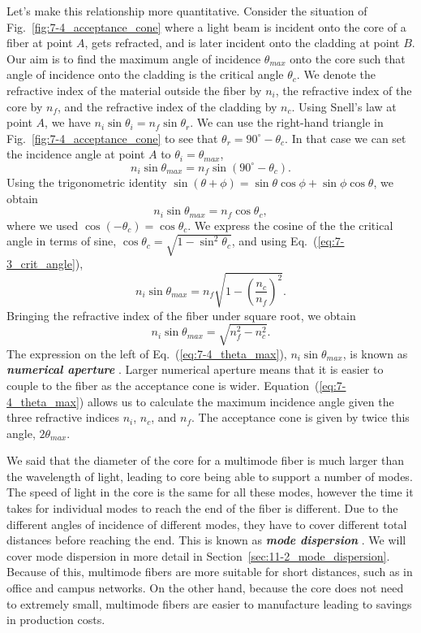 Let's make this relationship more quantitative.
Consider the situation of Fig.~\ref{fig:7-4_acceptance_cone} where a light beam is incident onto the core of a fiber at point $A$, gets refracted, and is later incident onto the cladding at point $B$.
Our aim is to find the maximum angle of incidence $\theta_{max}$ onto the core such that angle of incidence onto the cladding is the critical angle $\theta_c$.
We denote the refractive index of the material outside the fiber by $n_i$, the refractive index of the core by $n_f$, and the refractive index of the cladding by $n_c$.
Using Snell's law at point $A$, we have $n_i \sin \theta_i = n_f \sin \theta_r$.
We can use the right-hand triangle in Fig.~\ref{fig:7-4_acceptance_cone} to see that $\theta_r = 90^{\circ} - \theta_c$.
In that case we can set the incidence angle at point $A$ to $\theta_i = \theta_{max}$,
\begin{equation}
    n_i \sin \theta_{max} = n_f \sin (90^{\circ} - \theta_c).
\end{equation}
Using the trigonometric identity $\sin(\theta + \phi) = \sin\theta\cos\phi + \sin\phi\cos\theta$, we obtain
\begin{equation}
    n_i \sin \theta_{max} = n_f \cos\theta_c,
\end{equation}
where we used $\cos(-\theta_c) = \cos\theta_c$.
We express the cosine of the the critical angle in terms of sine, $\cos\theta_c = \sqrt{1 - \sin^2\theta_c}$, and using Eq.~(\ref{eq:7-3_crit_angle}),
\begin{equation}
    n_i \sin \theta_{max} = n_f \sqrt{1 - \left( \frac{n_c}{n_f} \right)^2}.
\end{equation}
Bringing the refractive index of the fiber under square root, we obtain
\begin{equation}
    n_i \sin \theta_{max} = \sqrt{n_f^2 -  n_c^2}.
    \label{eq:7-4_theta_max}
\end{equation}
The expression on the left of Eq.~(\ref{eq:7-4_theta_max}), $n_i \sin \theta_{max}$, is known as \textit{\textbf{numerical aperture}} .
Larger numerical aperture means that it is easier to couple to the fiber as the acceptance cone is wider.
Equation~(\ref{eq:7-4_theta_max}) allows us to calculate the maximum incidence angle given the three refractive indices $n_i$, $n_c$, and $n_f$.
The acceptance cone is given by twice this angle, $2 \theta_{max}$.

We said that the diameter of the core for a multimode fiber is much larger than the wavelength of light, leading to core being able to support a number of modes.
The speed of light in the core is the same for all these modes, however the time it takes for individual modes to reach the end of the fiber is different.
Due to the different angles of incidence of different modes, they have to cover different total distances before reaching the end.
This is known as \textit{\textbf{mode dispersion}} .
We will cover mode dispersion in more detail in Section~\ref{sec:11-2_mode_dispersion}.
Because of this, multimode fibers are more suitable for short distances, such as in office and campus networks.
On the other hand, because the core does not need to extremely small, multimode fibers are easier to manufacture leading to savings in production costs.

